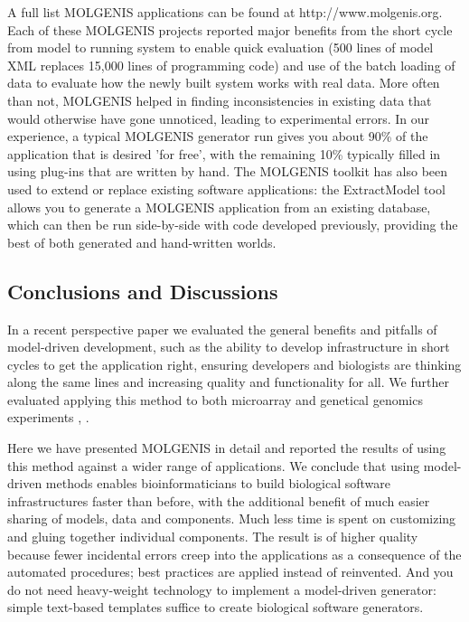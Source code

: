 A full list MOLGENIS applications can be found at http://www.molgenis.org. Each of these MOLGENIS projects 
reported major benefits from the short cycle from model to running system to enable quick evaluation 
(500 lines of model XML replaces 15,000 lines of programming code) and use of the batch loading of 
data to evaluate how the newly built system works with real data. More often than not, MOLGENIS 
helped in finding inconsistencies in existing data that would otherwise have gone unnoticed, leading 
to experimental errors. In our experience, a typical MOLGENIS generator run gives you about 90\% of 
the application that is desired 'for free', with the remaining 10\% typically filled in using plug-ins 
that are written by hand. The MOLGENIS toolkit has also been used to extend or replace existing 
software applications: the ExtractModel tool allows you to generate a MOLGENIS application from an 
existing database, which can then be run side-by-side with code developed previously, providing the 
best of both generated and hand-written worlds.

\subsection{Conclusions and Discussions}
In a recent perspective paper \cite{Swertz:2007} we evaluated the general benefits and pitfalls of model-driven 
development, such as the ability to develop infrastructure in short cycles to get the application 
right, ensuring developers and biologists are thinking along the same lines and increasing quality 
and functionality for all. We further evaluated applying this method to both microarray and genetical 
genomics experiments \cite{Swertz:2004}, \cite{Swertz:2010a}	.

Here we have presented MOLGENIS in detail and reported the results of using this method against a 
wider range of applications. We conclude that using model-driven methods enables bioinformaticians 
to build biological software infrastructures faster than before, with the additional benefit of 
much easier sharing of models, data and components. Much less time is spent on customizing and gluing 
together individual components. The result is of higher quality because fewer incidental errors creep 
into the applications as a consequence of the automated procedures; best practices are applied 
instead of reinvented. And you do not need heavy-weight technology to implement a model-driven 
generator: simple text-based templates suffice to create biological software generators.

